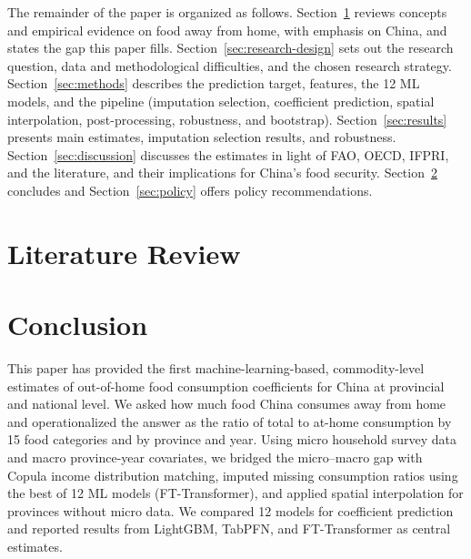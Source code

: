 \documentclass[12pt,a4paper]{article}
\begin{document}
The remainder of the paper is organized as follows. Section~\ref{sec:literature} reviews concepts and empirical evidence on food away from home, with emphasis on China, and states the gap this paper fills. Section~\ref{sec:research-design} sets out the research question, data and methodological difficulties, and the chosen research strategy. Section~\ref{sec:methods} describes the prediction target, features, the 12 ML models, and the pipeline (imputation selection, coefficient prediction, spatial interpolation, post-processing, robustness, and bootstrap). Section~\ref{sec:results} presents main estimates, imputation selection results, and robustness. Section~\ref{sec:discussion} discusses the estimates in light of FAO, OECD, IFPRI, and the literature, and their implications for China's food security. Section~\ref{sec:conclusion} concludes and Section~\ref{sec:policy} offers policy recommendations.

\section{Literature Review}
\label{sec:literature}











\section{Conclusion}
\label{sec:conclusion}

This paper has provided the first machine-learning-based, commodity-level estimates of out-of-home food consumption coefficients for China at provincial and national level. We asked how much food China consumes away from home and operationalized the answer as the ratio of total to at-home consumption by 15 food categories and by province and year. Using micro household survey data and macro province-year covariates, we bridged the micro--macro gap with Copula income distribution matching, imputed missing consumption ratios using the best of 12 ML models (FT-Transformer), and applied spatial interpolation for provinces without micro data. We compared 12 models for coefficient prediction and reported results from LightGBM, TabPFN, and FT-Transformer as central estimates.
\end{document}
